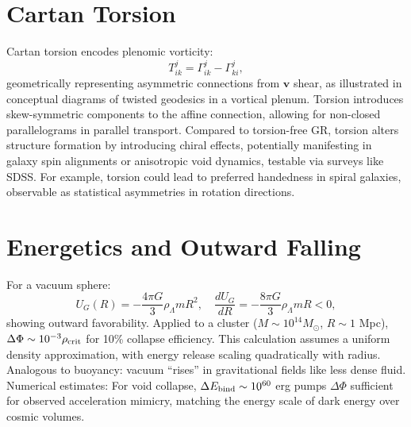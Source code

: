 \documentclass[11pt]{article}
\theoremstyle{plain}
\theoremstyle{definition}
\begin{document}
\section{Cartan Torsion}
Cartan torsion encodes plenomic vorticity:
\begin{equation}
T^j_{ik} = \Gamma^j_{ik} - \Gamma^j_{ki},
\end{equation}
geometrically representing asymmetric connections from $\bm{v}$ shear, as illustrated in conceptual diagrams of twisted geodesics in a vortical plenum. Torsion introduces skew-symmetric components to the affine connection, allowing for non-closed parallelograms in parallel transport.
Compared to torsion-free GR, torsion alters structure formation by introducing chiral effects, potentially manifesting in galaxy spin alignments or anisotropic void dynamics, testable via surveys like SDSS. For example, torsion could lead to preferred handedness in spiral galaxies, observable as statistical asymmetries in rotation directions.
\section{Energetics and Outward Falling}
For a vacuum sphere:
\begin{equation}
U_G(R) = -\frac{4\pi G}{3} \rho_\Lambda m R^2, \quad \frac{dU_G}{dR} = -\frac{8\pi G}{3} \rho_\Lambda m R < 0,
\end{equation}
showing outward favorability. Applied to a cluster ($M \sim 10^{14} M_\odot$, $R \sim 1$ Mpc), $\Delta \Phi \sim 10^{-3} \rho_{\rm crit}$ for 10\% collapse efficiency. This calculation assumes a uniform density approximation, with energy release scaling quadratically with radius.
Analogous to buoyancy: vacuum ``rises'' in gravitational fields like less dense fluid. Numerical estimates: For void collapse, $\Delta E_{\rm bind} \sim 10^{60}$ erg pumps $\Delta \Phi$ sufficient for observed acceleration mimicry, matching the energy scale of dark energy over cosmic volumes.
\end{document}
